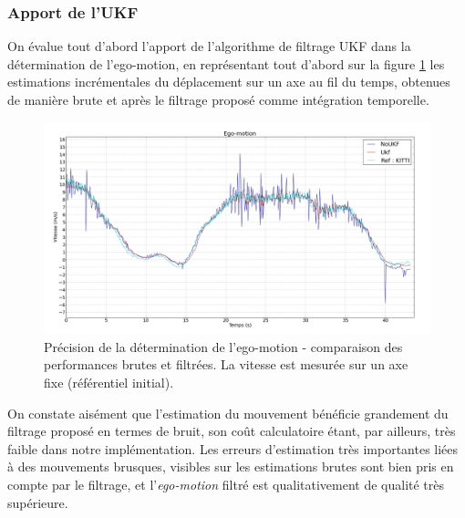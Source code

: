 \subsubsection{Apport de l'UKF}
On évalue tout d'abord l'apport de l'algorithme de filtrage UKF dans la détermination de l'ego-motion, en représentant tout d'abord sur la figure \ref{fig:ch4_egomotion_ukf_raw} les estimations incrémentales du déplacement sur un axe au fil du temps, obtenues de manière brute et après le filtrage proposé comme intégration temporelle.

\begin{figure} 
	\includegraphics[width=\textwidth]{Chapter4/graphics/ego_motion_UKF_RAW.png}
	\caption{Précision de la détermination de l'ego-motion - comparaison des performances brutes et filtrées. La vitesse est mesurée sur un axe fixe (référentiel initial).}
	\label{fig:ch4_egomotion_ukf_raw}
\end{figure}

On constate aisément que l'estimation du mouvement bénéficie grandement du filtrage proposé en termes de bruit, son coût calculatoire étant, par ailleurs, très faible dans notre implémentation. Les erreurs d'estimation très importantes liées à des mouvements brusques, visibles sur les estimations \og brutes\fg{} sont bien pris en compte par le filtrage, et l'\textit{ego-motion} filtré est qualitativement de qualité très supérieure.\\

